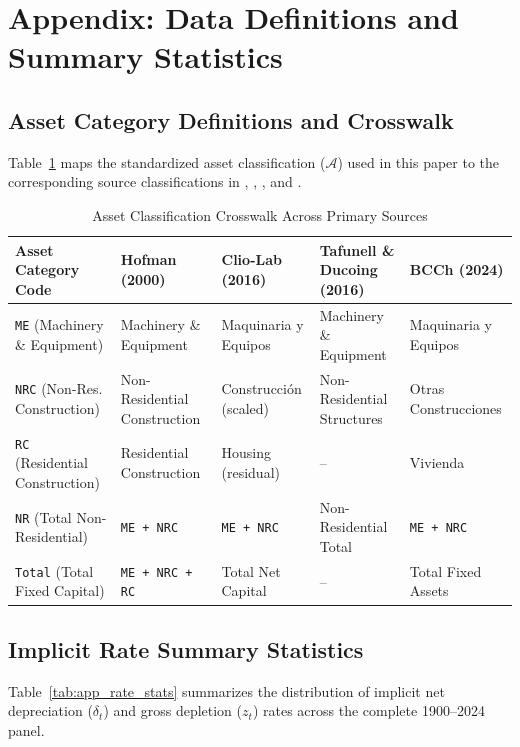 \section*{Appendix: Data Definitions and Summary Statistics}\label{app:crosswalk}

\subsection*{Asset Category Definitions and Crosswalk}
Table~\ref{tab:app_crosswalk} maps the standardized asset classification ($\mathcal{A}$) used in this paper to the corresponding source classifications in \citet{Hofman2000a}, \citet{DiazWagner2016}, \citet{TafunellDucoing2016}, and \citet{BCCH2024}.

\begin{table}[htbp]
\centering
\caption{Asset Classification Crosswalk Across Primary Sources}\label{tab:app_crosswalk}
\small
\begin{tabularx}{\textwidth}{p{3.8cm} p{3.0cm} p{3.0cm} p{3.2cm} p{3.0cm}}
\toprule
\textbf{Asset Category Code} & \textbf{Hofman (2000)} & \textbf{Clio-Lab (2016)} & \textbf{Tafunell \& Ducoing (2016)} & \textbf{BCCh (2024)} \\
\midrule
\texttt{ME} (Machinery \& Equipment) & Machinery \& Equipment & Maquinaria y Equipos & Machinery \& Equipment & Maquinaria y Equipos \\
\texttt{NRC} (Non-Res. Construction) & Non-Residential Construction & Construcci\'{o}n (scaled) & Non-Residential Structures & Otras Construcciones \\
\texttt{RC} (Residential Construction) & Residential Construction & Housing (residual) & -- & Vivienda \\
\texttt{NR} (Total Non-Residential) & \texttt{ME + NRC} & \texttt{ME + NRC} & Non-Residential Total & \texttt{ME + NRC} \\
\texttt{Total} (Total Fixed Capital) & \texttt{ME + NRC + RC} & Total Net Capital & -- & Total Fixed Assets \\
\bottomrule
\end{tabularx}
\end{table}

\subsection*{Implicit Rate Summary Statistics}
Table~\ref{tab:app_rate_stats} summarizes the distribution of implicit net depreciation ($\delta_t$) and gross depletion ($z_t$) rates across the complete 1900--2024 panel.

